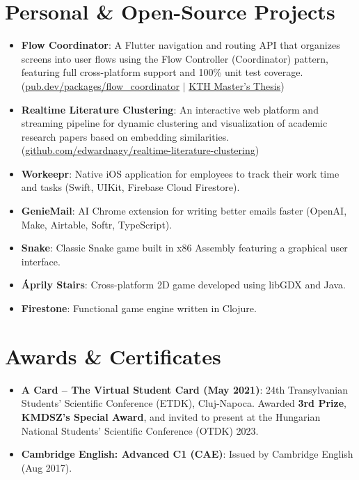 \documentclass[letterpaper,11pt]{article}
\newcommand{\resumeItem}[2]{
  \item\small{
    \textbf{#1}{: #2 \vspace{-2pt}}
  }
}
\newcommand{\resumeSubItem}[2]{\resumeItem{#1}{#2}\vspace{-4pt}}
\newcommand{\resumeSubHeadingListStart}{\begin{itemize}[leftmargin=*]}
\newcommand{\resumeSubHeadingListEnd}{\end{itemize}}
\begin{document}
\section{Personal \& Open-Source Projects}
  \resumeSubHeadingListStart
    \resumeSubItem{Flow Coordinator}
      {A Flutter navigation and routing API that organizes screens into user flows using the Flow Controller (Coordinator) pattern, featuring full cross-platform support and 100\% unit test coverage. (\href{https://pub.dev/packages/flow_coordinator}{\underline{pub.dev/packages/flow\_coordinator}} $|$ \href{https://urn.kb.se/resolve?urn=urn:nbn:se:kth:diva-381802}{\underline{KTH Master's Thesis}})}
    \resumeSubItem{Realtime Literature Clustering}
      {An interactive web platform and streaming pipeline for dynamic clustering and visualization of academic research papers based on embedding similarities. (\href{https://github.com/edwardnagy/realtime-literature-clustering}{\underline{github.com/edwardnagy/realtime-literature-clustering}})}
    \resumeSubItem{Workeepr}
      {Native iOS application for employees to track their work time and tasks (Swift, UIKit, Firebase Cloud Firestore).}
    \resumeSubItem{GenieMail}
      {AI Chrome extension for writing better emails faster (OpenAI, Make, Airtable, Softr, TypeScript).}
    \resumeSubItem{Snake}
      {Classic Snake game built in x86 Assembly featuring a graphical user interface.}
    \resumeSubItem{Áprily Stairs}
      {Cross-platform 2D game developed using libGDX and Java.}
    \resumeSubItem{Firestone}
      {Functional game engine written in Clojure.}
  \resumeSubHeadingListEnd


\section{Awards \& Certificates}
  \resumeSubHeadingListStart
    \resumeSubItem{A Card -- The Virtual Student Card (May 2021)}
      {24th Transylvanian Students' Scientific Conference (ETDK), Cluj-Napoca. Awarded \textbf{3rd Prize}, \textbf{KMDSZ's Special Award}, and invited to present at the Hungarian National Students' Scientific Conference (OTDK) 2023.}
    \resumeSubItem{Cambridge English: Advanced C1 (CAE)}
      {Issued by Cambridge English (Aug 2017).}
  \resumeSubHeadingListEnd

\end{document}
